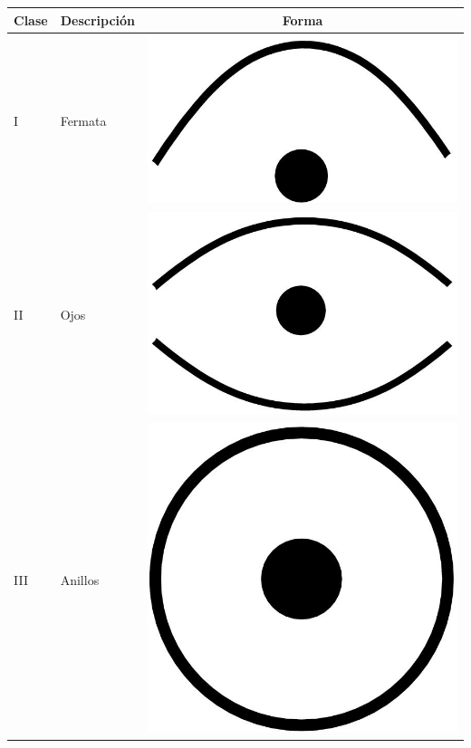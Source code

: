 \begin{table}
  \centering
  \begin{tabular}{llc}
    \toprule
    Clase & Descripción & Forma \\
    \midrule
    I & Fermata & \includegraphics[scale=0.03]{./Figures/fermata} \\
    II & Ojos   & \includegraphics[scale=0.03]{./Figures/eyes} \\
    III & Anillos & \includegraphics[scale=0.02]{./Figures/ring} \\

\end{tabular}
\end{table}
